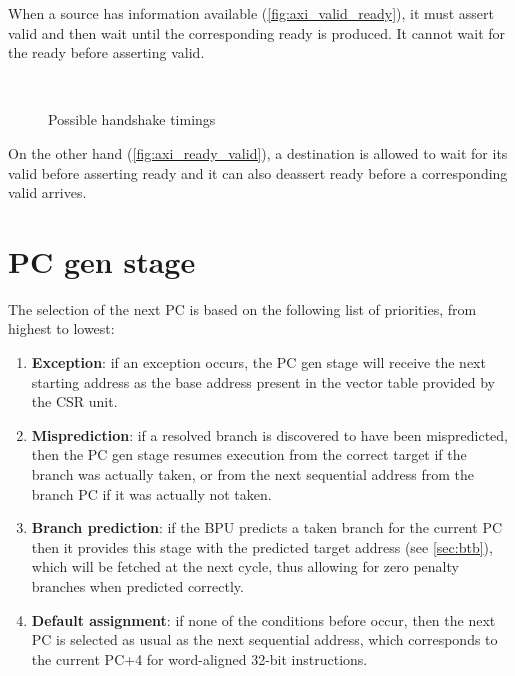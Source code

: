 When a source has information available (\cref{fig:axi_valid_ready}), it must assert valid and then wait until the corresponding ready is produced. It cannot wait for the ready before asserting valid.
\begin{figure}[hbt]
  \centering
   \\
  \caption{Possible handshake timings}
  \label{fig:axi_timings}
\end{figure}
On the other hand (\cref{fig:axi_ready_valid}), a destination is allowed to wait for its valid before asserting ready and it can also deassert ready before a corresponding valid arrives.

\section{\acs{PC} gen stage}
The selection of the next \ac{PC} is based on the following list of priorities, from highest to lowest:
\begin{enumerate}
  \item \textbf{Exception}: if an exception occurs, the \ac{PC} gen stage will receive the next starting address as the base address present in the vector table provided by the {\smaller CSR} unit.
  \item \textbf{Misprediction}: if a resolved branch is discovered to have been mispredicted, then the \ac{PC} gen stage resumes execution from the correct target if the branch was actually taken, or from the next sequential address from the branch \ac{PC} if it was actually not taken.
  \item \textbf{Branch prediction}: if the \ac{BPU} predicts a taken branch for the current \ac{PC} then it provides this stage with the predicted target address (see \cref{sec:btb}), which will be fetched at the next cycle, thus allowing for zero penalty branches when predicted correctly.
  \item \textbf{Default assignment}: if none of the conditions before occur, then the next \ac{PC} is selected as usual as the next sequential address, which corresponds to the current \ac{PC}+4 for word-aligned 32-bit instructions.
\end{enumerate}

